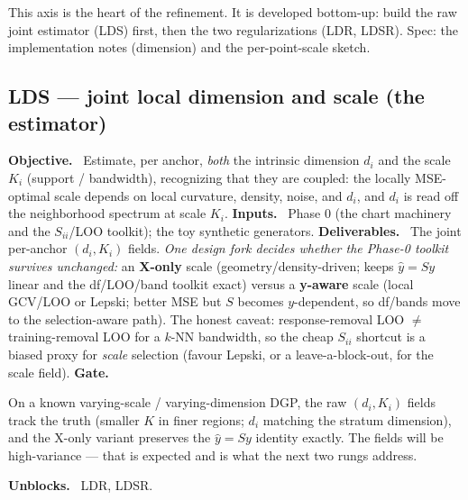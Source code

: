 \documentclass[11pt]{article}
\newcommand{\field}[1]{\smallskip\noindent\textbf{\textsf{#1.}}\ }
\begin{document}
This axis is the heart of the refinement. It is developed bottom-up: build the raw
joint estimator (LDS) first, then the two regularizations (LDR, LDSR). Spec: the
implementation notes (dimension) and the per-point-scale sketch.

\subsection{LDS --- joint local dimension and scale (the estimator)}\label{sec:lds}
\field{Objective} Estimate, per anchor, \emph{both} the intrinsic dimension $d_i$
and the scale $K_i$ (support / bandwidth), recognizing that they are coupled: the
locally MSE-optimal scale depends on local curvature, density, noise, and $d_i$, and
$d_i$ is read off the neighborhood spectrum at scale $K_i$.
\field{Inputs} Phase 0 (the chart machinery and the $S_{ii}$/LOO toolkit); the toy
synthetic generators.
\field{Deliverables} The joint per-anchor $(d_i,K_i)$ fields. \emph{One design fork
decides whether the Phase-0 toolkit survives unchanged:} an \textbf{X-only} scale
(geometry/density-driven; keeps $\hat y = Sy$ linear and the df/LOO/band toolkit
exact) versus a \textbf{y-aware} scale (local GCV/LOO or Lepski; better MSE but
$S$ becomes $y$-dependent, so df/bands move to the selection-aware path). The honest
caveat: response-removal LOO $\neq$ training-removal LOO for a $k$-NN bandwidth, so
the cheap $S_{ii}$ shortcut is a biased proxy for \emph{scale} selection (favour
Lepski, or a leave-a-block-out, for the scale field).
\field{Gate} \begin{gate} On a known varying-scale / varying-dimension DGP, the raw
$(d_i,K_i)$ fields track the truth (smaller $K$ in finer regions; $d_i$ matching the
stratum dimension), and the X-only variant preserves the $\hat y = Sy$ identity
exactly. The fields will be high-variance --- that is expected and is what the next
two rungs address.\end{gate}
\field{Unblocks} LDR, LDSR.
\end{document}
